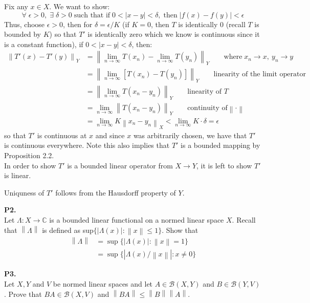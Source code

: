 \documentclass{article}
\newcommand{\norm}[1]{\left\lVert#1\right\rVert}
\begin{document}
    Fix any $x\in X$. We want to show:
    \[ \forall\;\epsilon>0,\;\exists\;\delta>0\;\text{such that if}\; 0<|x-y|<\delta,\;\text{then}\;|f(x)-f(y)|<\epsilon \]
    Thus, choose $\epsilon > 0$, then for $\delta = \epsilon/K$ (if $K=0$, then $T$ is identically 0 (recall $T$ is bounded by $K$) 
    so that $T'$ is identically zero which we know is continuous since it is a constant function), if $0<|x-y|<\delta$, then:
    \begin{align*}
        \norm{T'(x) - T'(y)}_Y &= \norm{\lim_{n\to\infty} T(x_n) - \lim_{n\to\infty} T(y_n)}_Y\qquad\text{where}\;x_n\to x,\:y_n\to y\\
            &= \norm{\lim_{n\to\infty} [T(x_n)-T(y_n)]}_Y\qquad\text{linearity of the limit operator} \\
            &= \norm{\lim_{n\to\infty} T(x_n-y_n)}_Y\qquad\text{linearity of $T$} \\
            &= \lim_{n\to\infty} \norm{T(x_n-y_n)}_Y\qquad\text{continuity of} \norm{\cdot} \\
            &= \lim_{n\to\infty} K\norm{x_n-y_n}_X < \lim_{n\to\infty} K\cdot \delta = \epsilon
    \end{align*}
    so that $T'$ is continuous at $x$ and since $x$ was arbitrarily chosen, we have that $T'$ is continuous everywhere. Note this also
    implies that $T'$ is a bounded mapping by Proposition 2.2.\\

    In order to show $T'$ is a bounded linear operator from $X\to Y$, it is left to show $T'$ is linear.

    Uniquness of $T'$ follows from the Hausdorff property of $Y$.
    
    \newpage

    \textbf{P2.}\\

    Let $\Lambda:X\to\mathbb{C}$ is a bounded linear functional on a normed linear space $X$. Recall that $\norm{\Lambda}$ is defined
    as sup$\{|\Lambda(x)|: \norm{x}\leq 1\}$. Show that
    \begin{align*}
        \norm{\Lambda} &=\sup\{|\Lambda(x)|: \norm{x}=1\} \\
            &=\sup\{|\Lambda(x)/\norm{x}|: x\neq 0\}
    \end{align*}

    \textbf{P3.}\\

    Let $X,Y$ and $V$ be normed linear spaces and let $A\in\mathcal{B}(X,Y)$ and $B\in\mathcal{B}(Y,V)$. Prove that
    $BA\in\mathcal{B}(X,V)$ and $\norm{BA}\leq \norm{B}\norm{A}$.\\
\end{document}
